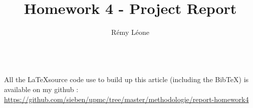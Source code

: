 \documentclass{sig-alternate}
\newcommand{\BibTeX}{{\sc Bib}\TeX}
\begin{document}
\title{Homework 4 - Project Report}


\author{
  \alignauthor
    Rémy Léone\\
    \\
}

\maketitle





\appendix
\makeatletter
\def\@seccntformat#1{Appendix~\csname the#1\endcsname:\quad}
\makeatother

All the \LaTeX source code use to build up this 
article (including the \BibTeX) is available on my github :
\href{https://github.com/sieben/upmc/tree/master/methodologie/report-homework4}{
https://github.com/sieben/upmc/tree/master/methodologie/report-homework4}

%
\end{document}
